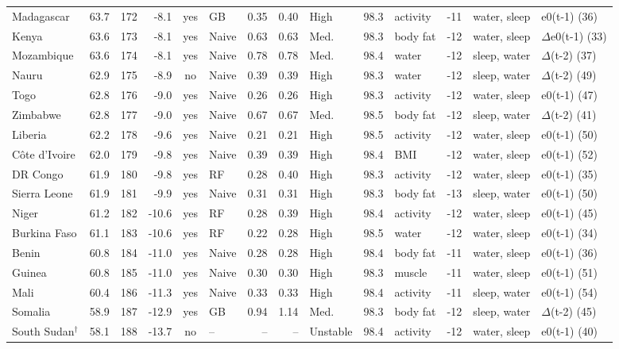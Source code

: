 {\begin{longtable}{l r r r c l r r l r l r l l}
Madagascar & 63.7 & 172 & -8.1 & yes & GB & 0.35 & 0.40 & High & 98.3 & activity & -11 & water, sleep & e0(t-1) (36) \\
Kenya & 63.6 & 173 & -8.1 & yes & Naive & 0.63 & 0.63 & Med. & 98.3 & body fat & -12 & water, sleep & $\Delta$e0(t-1) (33) \\
Mozambique & 63.6 & 174 & -8.1 & yes & Naive & 0.78 & 0.78 & Med. & 98.4 & water & -12 & sleep, water & $\Delta$(t-2) (37) \\
Nauru & 62.9 & 175 & -8.9 & no & Naive & 0.39 & 0.39 & High & 98.3 & water & -12 & sleep, water & $\Delta$(t-2) (49) \\
Togo & 62.8 & 176 & -9.0 & yes & Naive & 0.26 & 0.26 & High & 98.3 & activity & -12 & water, sleep & e0(t-1) (47) \\
Zimbabwe & 62.8 & 177 & -9.0 & yes & Naive & 0.67 & 0.67 & Med. & 98.5 & body fat & -12 & sleep, water & $\Delta$(t-2) (41) \\
Liberia & 62.2 & 178 & -9.6 & yes & Naive & 0.21 & 0.21 & High & 98.5 & activity & -12 & water, sleep & e0(t-1) (50) \\
Côte d'Ivoire & 62.0 & 179 & -9.8 & yes & Naive & 0.39 & 0.39 & High & 98.4 & BMI & -12 & water, sleep & e0(t-1) (52) \\
DR Congo & 61.9 & 180 & -9.8 & yes & RF & 0.28 & 0.40 & High & 98.3 & activity & -12 & water, sleep & e0(t-1) (35) \\
Sierra Leone & 61.9 & 181 & -9.9 & yes & Naive & 0.31 & 0.31 & High & 98.3 & body fat & -13 & sleep, water & e0(t-1) (50) \\
Niger & 61.2 & 182 & -10.6 & yes & RF & 0.28 & 0.39 & High & 98.4 & activity & -12 & water, sleep & e0(t-1) (45) \\
Burkina Faso & 61.1 & 183 & -10.6 & yes & RF & 0.22 & 0.28 & High & 98.5 & water & -12 & water, sleep & e0(t-1) (34) \\
Benin & 60.8 & 184 & -11.0 & yes & Naive & 0.28 & 0.28 & High & 98.4 & body fat & -11 & water, sleep & e0(t-1) (36) \\
Guinea & 60.8 & 185 & -11.0 & yes & Naive & 0.30 & 0.30 & High & 98.3 & muscle & -11 & water, sleep & e0(t-1) (51) \\
Mali & 60.4 & 186 & -11.3 & yes & Naive & 0.33 & 0.33 & High & 98.4 & activity & -11 & sleep, water & e0(t-1) (54) \\
Somalia & 58.9 & 187 & -12.9 & yes & GB & 0.94 & 1.14 & Med. & 98.3 & body fat & -12 & sleep, water & $\Delta$(t-2) (45) \\
South Sudan$^\dagger$ & 58.1 & 188 & -13.7 & no & -- & -- & -- & Unstable & 98.4 & activity & -12 & water, sleep & e0(t-1) (40) \\

\end{longtable}}
